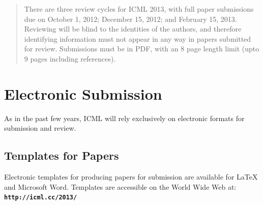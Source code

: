 \documentclass{article}
\begin{document}
 


\begin{abstract} 
There are three review cycles for ICML 2013, with full paper submissions 
due on October 1, 2012; December 15, 2012; and February 15, 2013. Reviewing 
will be blind to the identities of the authors, and therefore identifying
information must not appear in any way in papers submitted for review. 
Submissions must be in PDF, with an 8 page length limit (upto 9 pages 
including references).
\end{abstract} 

\section{Electronic Submission}
\label{submission}

As in the past few years, ICML will rely exclusively on
electronic formats for submission and review. 


\subsection{Templates for Papers}

Electronic templates for producing papers for submission are available
for \LaTeX\/ and Microsoft Word. Templates are accessible on the World
Wide Web at:\\
\textbf{\texttt{http://icml.cc/2013/}}
\end{document}
